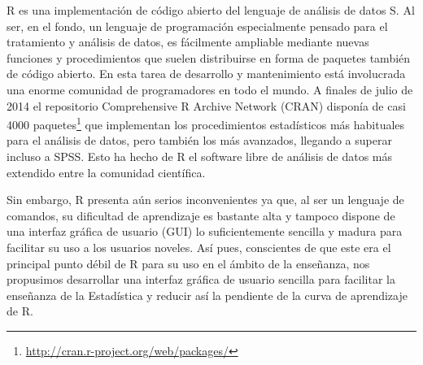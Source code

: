 \documentclass[10pt,twoside,spanish]{article}
\numberwithin{equation}{section}
\begin{document}
R es una implementación de código abierto del lenguaje de análisis de datos S.
Al ser, en el fondo, un lenguaje de programación especialmente pensado para el tratamiento y análisis de datos, es fácilmente ampliable
mediante nuevas funciones y procedimientos que suelen distribuirse en forma de paquetes también de código abierto. 
En esta tarea de desarrollo y mantenimiento está involucrada una enorme comunidad de programadores en todo el mundo. 
A finales de julio de 2014 el repositorio Comprehensive R Archive Network (CRAN) disponía de casi 4000
paquetes\footnote{\url{http://cran.r-project.org/web/packages/}} que implementan los procedimientos estadísticos más habituales para el
análisis de datos, pero también los más avanzados, llegando a superar incluso a SPSS. 
Esto ha hecho de R el software libre de análisis de datos más extendido entre la comunidad científica. 

Sin embargo, R presenta aún serios inconvenientes ya que, al ser un lenguaje de comandos, su dificultad de aprendizaje es bastante alta y
tampoco dispone de una interfaz gráfica de usuario (GUI) lo suficientemente sencilla y madura para facilitar su uso a los usuarios noveles.
Así pues, conscientes de que este era el principal punto débil de R para su uso en el ámbito de la enseñanza, nos propusimos desarrollar una
interfaz gráfica de usuario sencilla para facilitar la enseñanza de la Estadística y reducir así la pendiente de la curva de aprendizaje
de R.
\end{document}
